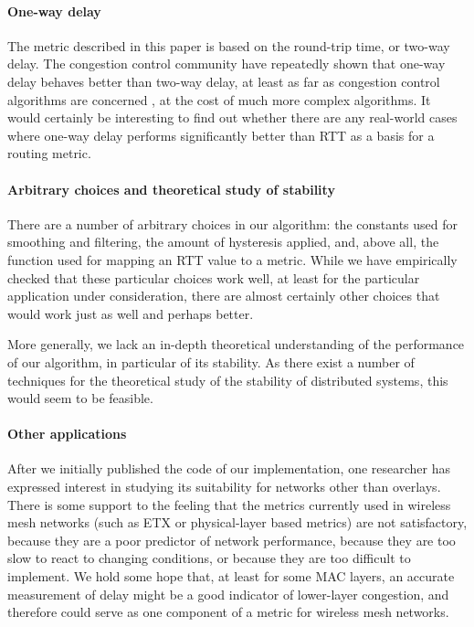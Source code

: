\documentclass[conference,letterpaper]{IEEEtran}
\begin{document}
\paragraph{One-way delay}

The metric described in this paper is based on the round-trip time, or
two-way delay.  The congestion control community have repeatedly shown
that one-way delay behaves better than two-way delay, at least as far
as congestion control algorithms are concerned \cite{tcp-lp,ledbat},
at the cost of much more complex algorithms.  It would certainly be
interesting to find out whether there are any real-world cases where
one-way delay performs significantly better than RTT as a basis for
a routing metric.

\paragraph{Arbitrary choices and theoretical study of stability}

There are a number of arbitrary choices in our algorithm: the
constants used for smoothing and filtering, the amount of hysteresis
applied, and, above all, the function used for mapping an RTT value to
a metric.  While we have empirically checked that these particular
choices work well, at least for the particular application under
consideration, there are almost certainly other choices that would
work just as well and perhaps better.

More generally, we lack an in-depth theoretical understanding of the
performance of our algorithm, in particular of its stability.  As
there exist a number of techniques for the theoretical study of the
stability of distributed systems, this would seem to be feasible.

\paragraph{Other applications}

After we initially published the code of our implementation, one
researcher has expressed interest in studying its suitability for
networks other than overlays.  There is some support to the feeling
that the metrics currently used in wireless mesh networks (such as ETX
\cite{etx} or physical-layer based metrics) are not satisfactory,
because they are a poor predictor of network performance, because they
are too slow to react to changing conditions, or because they are too
difficult to implement.  We hold some hope that, at least for some MAC
layers, an accurate measurement of delay might be a good indicator of
lower-layer congestion, and therefore could serve as one component of
a metric for wireless mesh networks.
\end{document}
